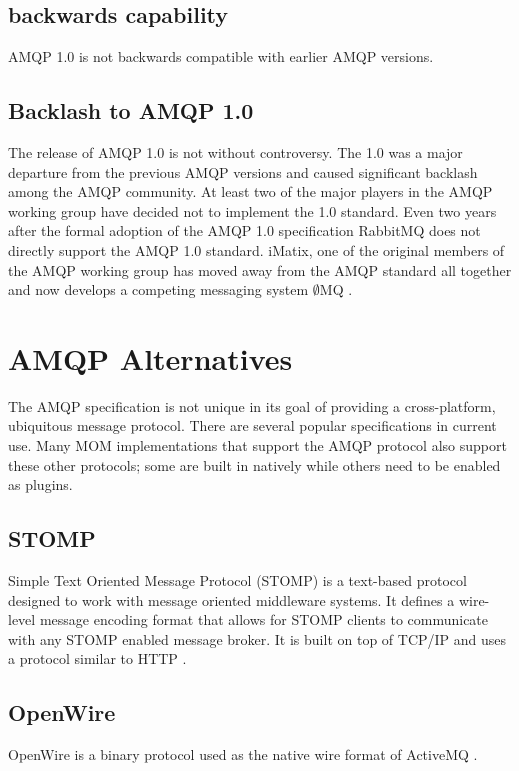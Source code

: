 \documentclass{thesis}
\begin{document}
\subsection{backwards capability}

AMQP 1.0 is not backwards compatible with earlier AMQP versions.  

\subsection{Backlash to AMQP 1.0}

The release of AMQP 1.0 is not without controversy.  The 1.0 was a major departure from the previous AMQP versions and caused significant backlash among the AMQP community.  At least two of the major players in the AMQP working group have decided not to implement the 1.0 standard.  Even two years after the formal adoption of the AMQP 1.0 specification RabbitMQ does not directly support the AMQP 1.0 standard.  iMatix, one of the original members of the AMQP working group has moved away from the AMQP standard all together and now develops a competing messaging system $\emptyset$MQ \cite{ZERO_MQ}. 

\section{AMQP Alternatives}
The AMQP specification is not unique in its goal of providing a cross-platform, ubiquitous message protocol.  There are several popular specifications in current use.  Many MOM implementations that support the AMQP protocol also support these other protocols; some are built in natively while others need to be enabled as plugins.   

\subsection{STOMP}
Simple Text Oriented Message Protocol (STOMP) is a text-based protocol designed to work with message oriented middleware systems.  It defines a wire-level message encoding format that allows for STOMP clients to communicate with any STOMP enabled message broker.  It is built on top of TCP/IP and uses a protocol similar to HTTP \cite{STOMP}.

\subsection{OpenWire}
OpenWire is a binary protocol used as the native wire format of ActiveMQ \cite{OPENWIRE}.
\end{document}
